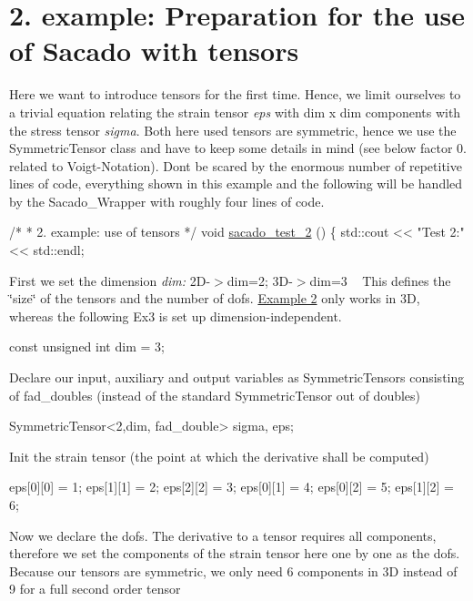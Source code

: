  \hypertarget{index_Ex2}{}\section{2. example\+: Preparation for the use of Sacado with tensors}\label{index_Ex2}
Here we want to introduce tensors for the first time. Hence, we limit ourselves to a trivial equation relating the strain tensor {\itshape eps} with dim x dim components with the stress tensor {\itshape sigma}. Both here used tensors are symmetric, hence we use the Symmetric\+Tensor class and have to keep some details in mind (see below factor 0. related to Voigt-\/\+Notation). Don\textquotesingle{}t be scared by the enormous number of repetitive lines of code, everything shown in this example and the following will be handled by the Sacado\+\_\+\+Wrapper with roughly four lines of code. 
\begin{DoxyCode}
\textcolor{comment}{/*}
\textcolor{comment}{ * 2. example: use of tensors}
\textcolor{comment}{ */}
\textcolor{keywordtype}{void} \hyperlink{example__code__to__be__documented_8cc_a8ef4ff1e9526ca8451cdcd1678366d2c}{sacado\_test\_2} ()
\{
    std::cout << \textcolor{stringliteral}{"Test 2:"} << std::endl;
\end{DoxyCode}
 First we set the dimension {\itshape dim\+:} 2\+D-\/$>$dim=2; 3\+D-\/$>$dim=3 ~\newline
 This defines the \char`\"{}size\char`\"{} of the tensors and the number of dofs. \hyperlink{index_Ex2}{Example 2} only works in 3D, whereas the following Ex3 is set up dimension-\/independent. 
\begin{DoxyCode}
\textcolor{keyword}{const} \textcolor{keywordtype}{unsigned} \textcolor{keywordtype}{int} dim = 3;
\end{DoxyCode}
 Declare our input, auxiliary and output variables as Symmetric\+Tensors consisting of fad\+\_\+doubles (instead of the standard Symmetric\+Tensor out of doubles) 
\begin{DoxyCode}
SymmetricTensor<2,dim, fad\_double> sigma, eps;
\end{DoxyCode}
 Init the strain tensor (the point at which the derivative shall be computed) 
\begin{DoxyCode}
eps[0][0] = 1;
eps[1][1] = 2;
eps[2][2] = 3;
eps[0][1] = 4;
eps[0][2] = 5;
eps[1][2] = 6;
\end{DoxyCode}
 Now we declare the dofs. The derivative to a tensor requires all components, therefore we set the components of the strain tensor here one by one as the dofs. Because our tensors are symmetric, we only need 6 components in 3D instead of 9 for a full second order tensor 
